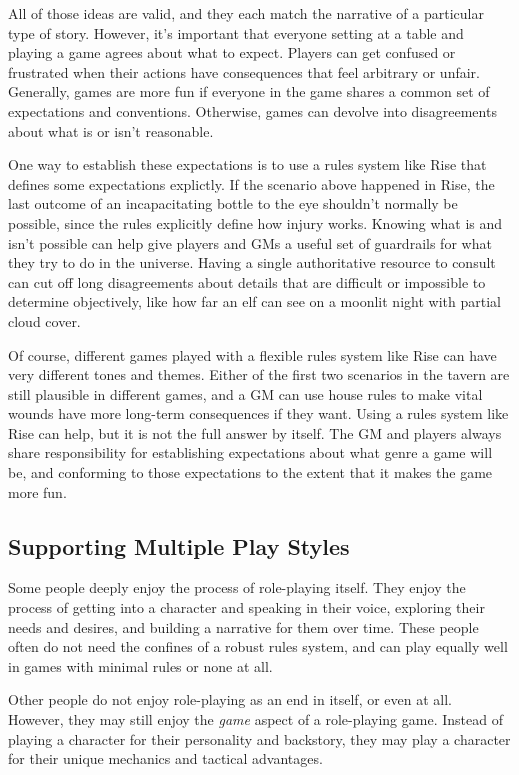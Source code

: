         All of those ideas are valid, and they each match the narrative of a particular type of story.
        However, it's important that everyone setting at a table and playing a game agrees about what to expect.
        Players can get confused or frustrated when their actions have consequences that feel arbitrary or unfair.
        Generally, games are more fun if everyone in the game shares a common set of expectations and conventions.
        Otherwise, games can devolve into disagreements about what is or isn't reasonable.

        One way to establish these expectations is to use a rules system like Rise that defines some expectations explictly.
        If the scenario above happened in Rise, the last outcome of an incapacitating bottle to the eye shouldn't normally be possible, since the rules explicitly define how injury works.
        Knowing what is and isn't possible can help give players and GMs a useful set of guardrails for what they try to do in the universe.
        Having a single authoritative resource to consult can cut off long disagreements about details that are difficult or impossible to determine objectively, like how far an elf can see on a moonlit night with partial cloud cover.

        Of course, different games played with a flexible rules system like Rise can have very different tones and themes.
        Either of the first two scenarios in the tavern are still plausible in different games, and a GM can use house rules to make vital wounds have more long-term consequences if they want.
        Using a rules system like Rise can help, but it is not the full answer by itself.
        The GM and players always share responsibility for establishing expectations about what genre a game will be, and conforming to those expectations to the extent that it makes the game more fun.

    \subsection{Supporting Multiple Play Styles}
        Some people deeply enjoy the process of role-playing itself.
        They enjoy the process of getting into a character and speaking in their voice, exploring their needs and desires, and building a narrative for them over time.
        These people often do not need the confines of a robust rules system, and can play equally well in games with minimal rules or none at all.

        Other people do not enjoy role-playing as an end in itself, or even at all.
        However, they may still enjoy the \textit{game} aspect of a role-playing game.
        Instead of playing a character for their personality and backstory, they may play a character for their unique mechanics and tactical advantages.

